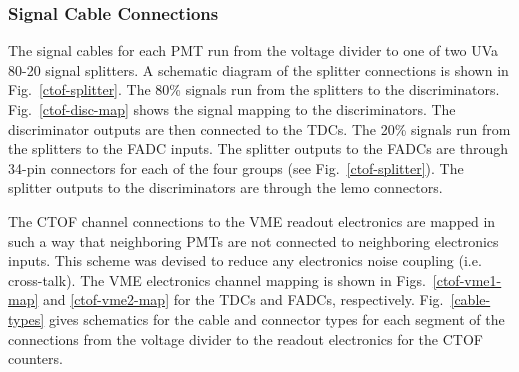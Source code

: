 \documentclass[12pt]{article}
\begin{document}
\subsubsection{Signal Cable Connections}
\label{signal-conn}

The signal cables for each PMT run from the voltage divider to one of two UVa 
80-20 signal splitters. A schematic diagram of the splitter connections is shown 
in Fig.~\ref{ctof-splitter}. The 80\% signals run from the splitters to the 
discriminators. Fig.~\ref{ctof-disc-map} shows the signal mapping to the 
discriminators. The discriminator outputs are then connected to the TDCs. The 
20\% signals run from the splitters to the FADC inputs. The splitter outputs to 
the FADCs are through 34-pin connectors for each of the four groups (see 
Fig.~\ref{ctof-splitter}). The splitter outputs to the discriminators are through 
the lemo connectors.

The CTOF channel connections to the VME readout electronics are mapped in such a 
way that neighboring PMTs are not connected to neighboring electronics inputs. 
This scheme was devised to reduce any electronics noise coupling (i.e. cross-talk). 
The VME electronics channel mapping is shown in Figs.~\ref{ctof-vme1-map} and 
\ref{ctof-vme2-map} for the TDCs and FADCs, respectively. Fig.~\ref{cable-types} 
gives schematics for the cable and connector types for each segment of the 
connections from the voltage divider to the readout electronics for the CTOF 
counters.
\end{document}
